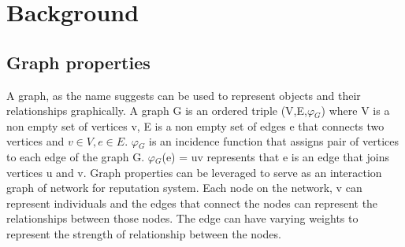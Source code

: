 \chapter{Background} \label{ch:background}
\section{Graph properties}
A graph, as the name suggests can be used to represent objects and their relationships 
graphically. A graph G is an ordered triple (V,E,$\varphi$$_{G}$) where V is a non empty set
of vertices v, E is a non empty set of edges e that connects two vertices and 
$v \in V, e \in E$. $\varphi$$_{G}$ is an incidence function that assigns pair of vertices
to each edge of the graph G. $\varphi$$_{G}$(e) = uv represents that e is an edge that 
joins vertices u and v. Graph properties can be leveraged to serve as an interaction 
graph of network for reputation system. Each node on the network, v can represent 
individuals and the edges that connect the nodes can represent the relationships 
between those nodes. The edge can have varying weights to represent the strength of 
relationship between the nodes. \cite{bondy1976graph}

